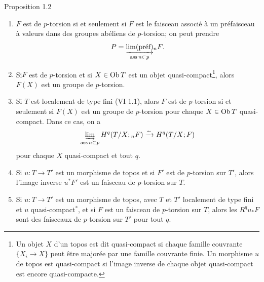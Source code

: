 \documentclass[10pt]{../fichiers-configuration-latex/smfart}
\begin{document}
\begin{enonce*}{Proposition 1.2}
\begin{enumerate}
\renewcommand{\theenumi}{\roman{enumi}}
\renewcommand{\labelenumi}{(\theenumi)}
\item $F$ est de $p$-torsion si et seulement si $F$ est le faisceau
  associé à un préfaisceau à valeurs dans des groupes abéliens de
  $p$-torsion; on peut prendre
$$
P=\underset{\operatorname{ass} n\subset p}{\underrightarrow{\lim(\text{\rm préf})}} {}_nF{}.
$$

\item Si\pageoriginale $F$ est de $p$-torsion et si $X\in \operatorname{Ob} T$ est
  un objet quasi-compact\footnote[1]{Un objet $X$ d'un topos est dit
  quasi-compact si chaque famille couvrante $\{X_i\rightarrow X\}$
  peut être majorée par une famille couvrante finie. Un morphisme $u$
  de topos est quasi-compact si l'image inverse de chaque objet
  quasi-compact est encore quasi-compacte.}, alors $F(X)$ est un
  groupe de $p$-torsion.

\item Si $T$ est localement de type fini {\rm (VI 1.1)}, alors $F$ est
  de $p$-torsion si et seulement si $F(X)$ est un groupe de
  $p$-torsion pour chaque $X\in \operatorname{Ob} T$ quasi-compact. Dans ce cas, on
  a
$$
\varinjlim_{\operatorname{ass} n\subset p} H^q(T/X; {}_nF)\xrightarrow{\sim}
H^q(T/X;F)
$$
pour chaque $X$ quasi-compact et tout $q$.

\item Si $u:T\rightarrow T'$ est un morphisme de topos et si $F'$ est
  de $p$-torsion sur $T'$, alors l'image inverse $u^{\ast}F'$ est un
  faisceau de $p$-torsion sur $T$.

\item Si $u:T\rightarrow T'$ est un morphisme de topos, avec $T$ et
  $T'$ localement de type fini et $u$ quasi-compact${}^\ast$, et si $F$ est un faisceau de $p$-torsion sur $T$, alors
  les $R^qu_{\ast}F$ sont des faisceaux de $p$-torsion sur $T'$ pour
  tout $q$.
\end{enumerate}
\end{enonce*}
\end{document}
